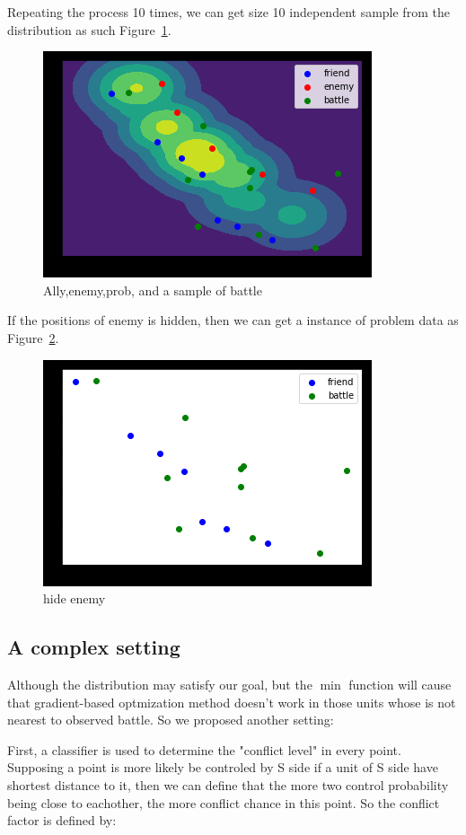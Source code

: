 \documentclass{article}
\begin{document}
Repeating the process 10 times, we can get size 10 independent sample from the distribution as such Figure~\ref{fig:stateSampleBattle}.

\begin{figure}[h]
\includegraphics[width=0.6\linewidth]{state_sample_battle.png}
\caption{Ally,enemy,prob, and a sample of battle}
\label{fig:stateSampleBattle}
\end{figure}

If the positions of enemy is hidden, then we can get a instance of problem data as Figure~\ref{fig:stateNoEnemy}.

\begin{figure}[h]
\includegraphics[width=0.6\linewidth]{state_no_enemy.png}
\caption{hide enemy}
\label{fig:stateNoEnemy}
\end{figure}

\subsection{A complex setting}

Although the distribution may satisfy our goal, but the $\min$ function will cause that gradient-based optmization
method doesn't work in those units whose is not nearest to observed battle. So we proposed another setting:

First, a classifier is used to determine the "conflict level" in every point.
Supposing a point is more likely be controled by S side 
if a unit of S side have shortest distance to it, then we can define that the more two control probability 
being close to eachother, the more conflict chance in this point. So the conflict factor is defined by:
\end{document}
